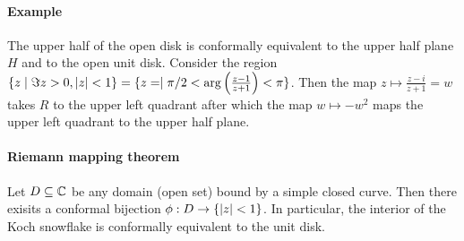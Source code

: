 \paragraph{Example}
The upper half of the open disk is conformally equivalent to the upper half plane $H$ and to the open unit disk. 
Consider the region $\{ z \mid \Im z > 0, \lvert z\rvert < 1 \} = \{ z = \mid \pi/2 < \arg \left(\frac{z-1}{z+1}\right) < \pi\}$. Then the map $z \mapsto \frac{z-i}{z+1} = w$ takes $R$ to the upper left quadrant after which the map $w \mapsto -w^2$ maps the upper left quadrant to the upper half plane.

\paragraph{Riemann mapping theorem}
Let $D \subseteq \mathbb{C}$ be any domain (open set) bound by a simple closed curve. Then there exisits a conformal bijection $\phi : D \rightarrow \{ \lvert z\rvert < 1 \}$. In particular, the interior of the Koch snowflake is conformally equivalent to the unit disk.



